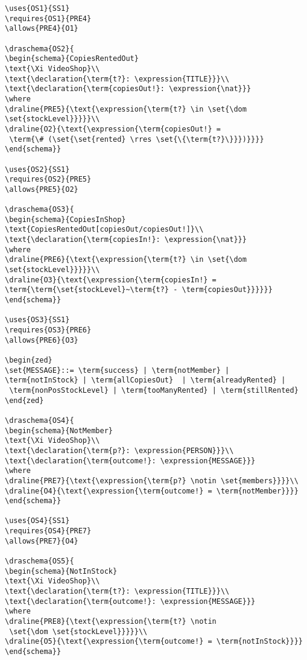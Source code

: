 \begin{verbatim}
\uses{OS1}{SS1}
\requires{OS1}{PRE4}
\allows{PRE4}{O1}

\draschema{OS2}{
\begin{schema}{CopiesRentedOut}
\text{\Xi VideoShop}\\
\text{\declaration{\term{t?}: \expression{TITLE}}}\\
\text{\declaration{\term{copiesOut!}: \expression{\nat}}}
\where
\draline{PRE5}{\text{\expression{\term{t?} \in \set{\dom \set{stockLevel}}}}}\\
\draline{O2}{\text{\expression{\term{copiesOut!} =
 \term{\# (\set{\set{rented} \rres \set{\{\term{t?}\}}})}}}}
\end{schema}}

\uses{OS2}{SS1}
\requires{OS2}{PRE5}
\allows{PRE5}{O2}

\draschema{OS3}{
\begin{schema}{CopiesInShop}
\text{CopiesRentedOut[copiesOut/copiesOut!]}\\
\text{\declaration{\term{copiesIn!}: \expression{\nat}}}
\where
\draline{PRE6}{\text{\expression{\term{t?} \in \set{\dom \set{stockLevel}}}}}\\
\draline{O3}{\text{\expression{\term{copiesIn!} = 
\term{\term{\set{stockLevel}~\term{t?} - \term{copiesOut}}}}}}
\end{schema}}

\uses{OS3}{SS1}
\requires{OS3}{PRE6}
\allows{PRE6}{O3}

\begin{zed}
\set{MESSAGE}::= \term{success} | \term{notMember} | 
\term{notInStock} | \term{allCopiesOut}  | \term{alreadyRented} |
 \term{nonPosStockLevel} | \term{tooManyRented} | \term{stillRented}
\end{zed}

\draschema{OS4}{
\begin{schema}{NotMember}
\text{\Xi VideoShop}\\
\text{\declaration{\term{p?}: \expression{PERSON}}}\\
\text{\declaration{\term{outcome!}: \expression{MESSAGE}}}
\where
\draline{PRE7}{\text{\expression{\term{p?} \notin \set{members}}}}\\
\draline{O4}{\text{\expression{\term{outcome!} = \term{notMember}}}}
\end{schema}}

\uses{OS4}{SS1}
\requires{OS4}{PRE7}
\allows{PRE7}{O4}

\draschema{OS5}{
\begin{schema}{NotInStock}
\text{\Xi VideoShop}\\
\text{\declaration{\term{t?}: \expression{TITLE}}}\\
\text{\declaration{\term{outcome!}: \expression{MESSAGE}}}
\where
\draline{PRE8}{\text{\expression{\term{t?} \notin
 \set{\dom \set{stockLevel}}}}}\\
\draline{O5}{\text{\expression{\term{outcome!} = \term{notInStock}}}}
\end{schema}}


\end{verbatim}
